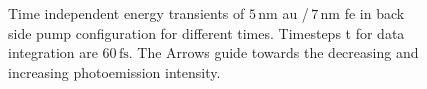 \documentclass[a4paper,12pt,twoside]{article}
\begin{document}
	\begin{figure}[H]
		\caption{Time independent energy transients of $5\,\mathrm{\mbox{nm}}$ \gls{au} /\,$7\,\mathrm{\mbox{nm}}$ \gls{fe} in back side pump configuration for different times. Timesteps \textDelta t for data integration are $60\,\mathrm{fs}$. The Arrows guide towards the decreasing and increasing photoemission intensity.}
    		\label{transients3}
	\end{figure}
 
\end{document}
